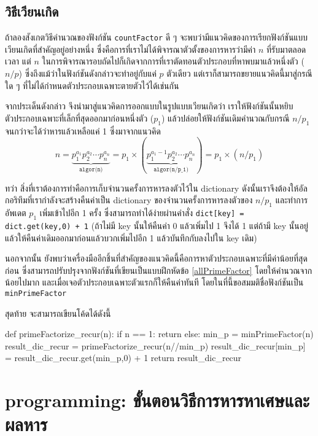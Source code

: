 \subsection{วิธีเวียนเกิด}
ถ้าลองสังเกตวิธีคำนวณของฟังก์ชัน \texttt{countFactor} ดี ๆ จะพบว่ามีแนวคิดของการเรียกฟังก์ชันแบบเวียนเกิดที่สำคัญอยู่อย่างหนึ่ง ซึ่งคือการที่เราไม่ได้พิจารณาตัวตั้งของการหารว่ามีค่า $n$ ที่รับมาตลอดเวลา แต่ $n$ ในการพิจารณารอบถัดไปก็เกิดจากการที่เราตัดทอนตัวประกอบที่หาพบมาแล้วหนึ่งตัว ($n/p$) ซึ่งถึงแม้ว่าในฟังก์ชันดังกล่าวจะทำอยู่กับแค่ $p$ ตัวเดียว แต่เราก็สามารถขยายแนวคิดนี้มาสู่กรณีใด ๆ ที่ไม่ได้กำหนดตัวประกอบเฉพาะตายตัวไว้ได้เช่นกัน

จากประเด็นดังกล่าว จึงนำมาสู่แนวคิดการออกแบบในรูปแบบเวียนเกิดว่า เราให้ฟังก์ชันนั้นหยิบตัวประกอบเฉพาะที่เล็กที่สุดออกมาก่อนหนึ่งตัว ($p_1$) แล้วปล่อยให้ฟังก์ชันเดิมคำนวณกับกรณี $n/p_1$ จนกว่าจะได้ว่าหารแล้วเหลือแค่ 1 ซึ่งมาจากแนวคิด
\[ n = \underbrace{p_1^{a_1}p_2^{a_2}\cdots p_n^{a_n}}_\texttt{algor(n)} = p_1 \times (\underbrace{p_1^{a_1 - 1}p_2^{a_2}\cdots p_n^{a_n}}_\texttt{algor(n/p\_1)}) = p_1 \times (n/p_1)\]

ทว่า สิ่งที่เราต้องการทำคือการเก็บจำนวนครั้งการหารลงตัวไว้ใน dictionary ดังนั้นเราจึงต้องให้อัลกอริทึมที่เรากำลังจะสร้างคืนค่าเป็น dictionary ของจำนวนครั้งการหารลงตัวของ $n/p_1$ และทำการอัพเดต $p_1$ เพิ่มเข้าไปอีก 1 ครั้ง ซึ่งสามารถทำได้ง่ายผ่านคำสั่ง \texttt{dict[key] = dict.get(key,0) + 1} (ถ้าไม่มี key นั้นให้คืนค่า 0 แล้วเพิ่มไป 1 จึงได้ 1 แต่ถ้ามี key นั้นอยู่แล้วให้คืนค่าเดิมออกมาก่อนแล้วบวกเพิ่มไปอีก 1 แล้วบันทึกกับลงไปใน key เดิม)

นอกจากนั้น ยังพบว่าเครื่องมืออีกชิ้นที่สำคัญของแนวคิดนี้คือการหาตัวประกอบเฉพาะที่มีค่าน้อยที่สุดก่อน ซึ่งสามารถปรับปรุงจากฟังก์ชันที่เขียนเป็นแบบฝึกหัดข้อ \ref{allPrimeFactor} โดยให้คำนวณจากน้อยไปมาก และเมื่อเจอตัวประกอบเฉพาะตัวแรกก็ให้คืนค่าทันที โดยในที่นี้ขอสมมติชื่อฟังก์ชันเป็น \texttt{minPrimeFactor}

สุดท้าย จะสามารถเขียนโค้ดได้ดังนี้
\begin{python}
def primeFactorize_recur(n):
    if n == 1:
        return {}
    else:
        min_p = minPrimeFactor(n)
        result_dic_recur = primeFactorize_recur(n//min_p)
        result_dic_recur[min_p] = result_dic_recur.get(min_p,0) + 1
        return result_dic_recur
\end{python}

\section{programming: ขั้นตอนวิธีการหารหาเศษและผลหาร} \label{prog:divisionAlgo}

